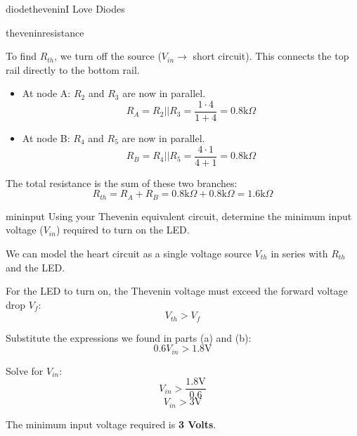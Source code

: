 \begin{mainquestion}{diodethevenin}{I Love Diodes}
\begin{partquestion}{theveninresistance}
\begin{answer}[2in]
        To find $R_{th}$, we turn off the source ($V_{in} \rightarrow$ short circuit). This connects the top rail directly to the bottom rail.
        \begin{itemize}
            \item At node A: $R_2$ and $R_3$ are now in parallel.
            \[ R_A = R_2 || R_3 = \frac{1 \cdot 4}{1 + 4} = 0.8\text{k}\Omega \]
            \item At node B: $R_4$ and $R_5$ are now in parallel.
            \[ R_B = R_4 || R_5 = \frac{4 \cdot 1}{4 + 1} = 0.8\text{k}\Omega \]
        \end{itemize}
        The total resistance is the sum of these two branches:
        \[ R_{th} = R_A + R_B = 0.8\text{k}\Omega + 0.8\text{k}\Omega = 1.6\text{k}\Omega \]
\end{answer}

\end{partquestion}

\begin{partquestion}{mininput}
{Using your Thevenin equivalent circuit, determine the minimum input voltage ($V_{in}$) required to turn on the LED.}

\begin{answer}[2in]
        We can model the heart circuit as a single voltage source $V_{th}$ in series with $R_{th}$ and the LED.
        
        For the LED to turn on, the Thevenin voltage must exceed the forward voltage drop $V_f$:
        \[ V_{th} > V_f \]
        
        Substitute the expressions we found in parts (a) and (b):
        \[ 0.6 V_{in} > 1.8\text{V} \]
        
        Solve for $V_{in}$:
        \[ V_{in} > \frac{1.8\text{V}}{0.6} \]
        \[ V_{in} > 3\text{V} \]
        
        The minimum input voltage required is \textbf{3 Volts}.
\end{answer}

\end{partquestion}

\end{mainquestion}
